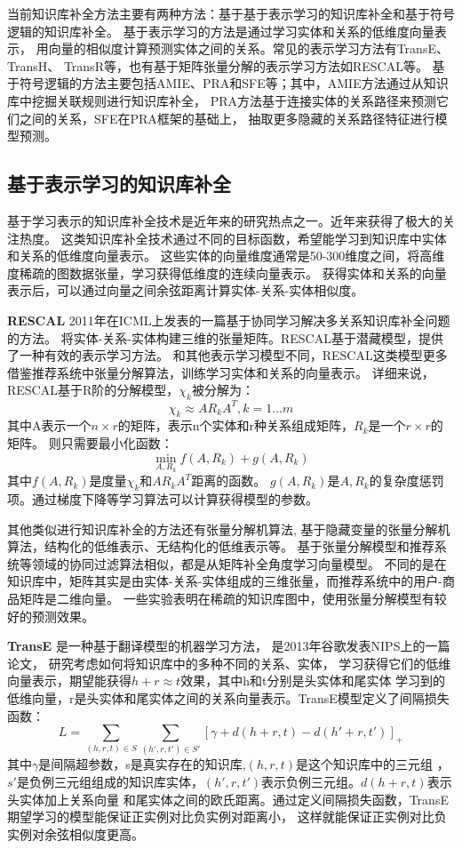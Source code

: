 当前知识库补全方法主要有两种方法：基于基于表示学习的知识库补全和基于符号逻辑的知识库补全。
基于表示学习的方法是通过学习实体和关系的低维度向量表示，
用向量的相似度计算预测实体之间的关系。常见的表示学习方法有TransE\cite{NIPS2013_5071}、TransH\cite{Wang2014KnowledgeGE}、
TransR\cite{Huang2017ImprovedKB}等，也有基于矩阵张量分解的表示学习方法如RESCAL\cite{Nickel2011}等。
基于符号逻辑的方法主要包括AMIE\cite{Galrraga2013AMIEAR}、PRA\cite{Lao2010}和SFE\cite{Gardner2015}等；其中，AMIE方法通过从知识库中挖掘关联规则进行知识库补全，
PRA方法基于连接实体的关系路径来预测它们之间的关系，SFE在PRA框架的基础上，
抽取更多隐藏的关系路径特征进行模型预测。

\subsection{基于表示学习的知识库补全}
\label{cha:presentation}
基于学习表示的知识库补全技术是近年来的研究热点之一。近年来获得了极大的关注热度。
这类知识库补全技术通过不同的目标函数，希望能学习到知识库中实体和关系的低维度向量表示。
这些实体的向量维度通常是50-300维度之间，将高维度稀疏的图数据张量，学习获得低维度的连续向量表示。
获得实体和关系的向量表示后，可以通过向量之间余弦距离计算实体-关系-实体相似度。

\textbf{RESCAL} 2011年在ICML上发表的一篇基于协同学习解决多关系知识库补全问题的方法。
将实体-关系-实体构建三维的张量矩阵。RESCAL基于潜藏模型，提供了一种有效的表示学习方法。
和其他表示学习模型不同，RESCAL这类模型更多借鉴推荐系统中张量分解算法，训练学习实体和关系的向量表示。
详细来说，RESCAL基于R阶的分解模型，$\chi_k$被分解为：
$$\chi_k \approx AR_{k}A^T, k =1...m$$
其中A表示一个$n\times r$的矩阵，表示n个实体和r种关系组成矩阵，$R_{k}$是一个$r\times r$的矩阵。
则只需要最小化函数：
$$\min \limits_{A,R_k} f(A,R_k)+g(A,R_k)$$
其中$f(A,R_k)$是度量$\chi_k$和$AR_{k}A^T$距离的函数。
$g(A,R_k)$是$A,R_k$的复杂度惩罚项。通过梯度下降等学习算法可以计算获得模型的参数。

其他类似进行知识库补全的方法还有张量分解机算法\cite{Rendle2010FactorizationM},
基于隐藏变量的张量分解机算法\cite{Rendle2012FactorizationMW}，结构化的低维表示\cite{2009EmbeddingLS}、无结构化的低维表示等。
基于张量分解模型和推荐系统等领域的协同过滤算法相似，都是从矩阵补全角度学习向量模型。
不同的是在知识库中，矩阵其实是由实体-关系-实体组成的三维张量，而推荐系统中的用户-商品矩阵是二维向量。
一些实验\cite{Dong2014}表明在稀疏的知识库图中，使用张量分解模型有较好的预测效果。

\textbf{TransE} 是一种基于翻译模型的机器学习方法，
是2013年谷歌发表NIPS上的一篇论文，
研究考虑如何将知识库中的多种不同的关系、实体，
学习获得它们的低维向量表示，期望能获得$h+r\approx t$效果，其中h和t分别是头实体和尾实体
学习到的低维向量，r是头实体和尾实体之间的关系向量表示。TransE模型定义了间隔损失函数：
$$L=\sum_{(h,r,t)\in S} \sum_{(h',r,t')\in S'}[\gamma+d(h+r,t)-d(h'+r,t')]_{+}$$
其中$\gamma$是间隔超参数，s是真实存在的知识库,$(h,r,t)$是这个知识库中的三元组
，$s'$是负例三元组组成的知识库实体，$(h',r,t')$表示负例三元组。$d(h+r,t)$表示头实体加上关系向量
和尾实体之间的欧氏距离。通过定义间隔损失函数，TransE期望学习的模型能保证正实例对比负实例对距离小，
这样就能保证正实例对比负实例对余弦相似度更高。

